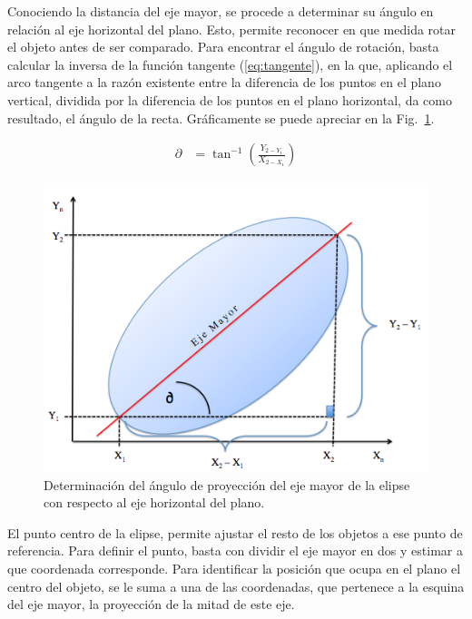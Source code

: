 Conociendo la distancia del eje mayor, se procede a determinar su
ángulo en relación al eje horizontal del plano. Esto, permite
reconocer en que medida rotar el objeto antes de ser comparado. Para
encontrar el ángulo de rotación, basta calcular la inversa de la
función tangente (\ref{eq:tangente}), en la que, aplicando el arco
tangente a la razón existente entre la diferencia de los puntos en el
plano vertical, dividida por la diferencia de los puntos en el plano
horizontal, da como resultado, el ángulo de la recta. Gráficamente se
puede apreciar en la Fig.~\ref{img:tangente}.

\begin{align}
  \partial & = \tan^{-1}\left(\frac{Y_{2-Y_1}}{X_{2-X_1}}\right)
  \label{eq:tangente}
\end{align}

\begin{figure}[hb!]
  \begin{center}
    \includegraphics[scale=.5]{image/detAngulo}
  \end{center}
  \caption{Determinación del ángulo de proyección del eje mayor de la
  elipse con respecto al eje horizontal del plano.}\label{img:tangente}
\end{figure}

El punto centro de la elipse, permite ajustar el resto de los objetos
a ese punto de referencia. Para definir el punto, basta con dividir el
eje mayor en dos y estimar a que coordenada corresponde. Para
identificar la posición que ocupa en el plano el centro del objeto, se
le suma a una de las coordenadas, que pertenece a la esquina del eje
mayor, la proyección de la mitad de este eje.

